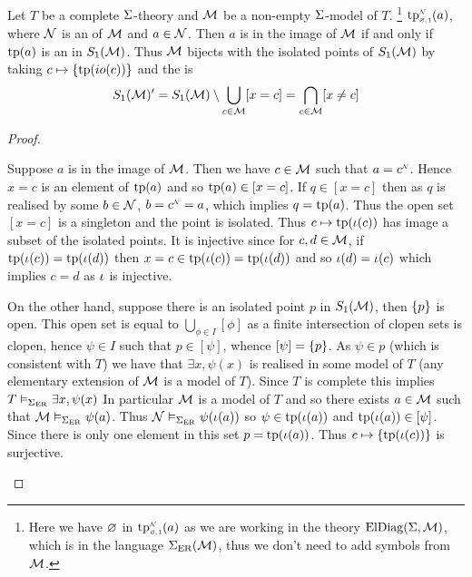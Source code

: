 \begin{lem}
    Let $T$ be a complete $\Sigma$-theory
    and $\mathcal{M}$ be a non-empty $\Sigma$-model of $T$. 
    \footnote{Here we have $\varnothing$ in 
            $\subintp{\nothing,1}{\NN}{\tp}(a)$ as we are working in the theory 
            $\mathrm{ElDiag}(\Sigma,\mathcal{M})$, 
            which is in the language $\Sigma_{\mathrm{ER}}(\mathcal{M})$,
            thus we don't need to add symbols from $\mathcal{M}$.}
        $\subintp{\nothing,1}{\NN}{\tp}(a)$, 
    where $\mathcal{N}$ is an
        of $\mathcal{M}$ and $a \in \mathcal{N}$.
    Then $a$ is in the image of $\mathcal{M}$ if and only if 
    $\operatorname{tp}(a)$ is an  
    in $S_1(\mathcal{M})$.
    Thus $\mathcal{M}$ bijects with the isolated points of $S_1(\mathcal{M})$
    by taking $c \mapsto \left\{\operatorname{tp}(io(c))\right\}$ and the 
     is
    \[  
        S_1(\mathcal{M})' = S_1(\mathcal{M}) \setminus \bigcup_{c \in \mathcal{M}} [x = c]
        = \bigcap_{c \in \mathcal{M}} [x \ne c] 
    \]
\end{lem}
\begin{proof}
    \begin{forward}
        Suppose $a$ is in the image of $\mathcal{M}$.
        Then we have $c \in \mathcal{M}$ such that $a = \nnintp{c}$.
        Hence $x = c$ is an element of $\operatorname{tp}(a)$ and so $\operatorname{tp}(a) \in [x = c]$.
        If $q \in [x = c]$ then as $q$ is realised by some $b \in \mathcal{N}$, 
        $b = \nnintp{c} = a$, 
        which implies $q = \operatorname{tp}(a)$.
        Thus the open set $[x = c]$ is a singleton and the point is isolated.
        Thus $c \mapsto \operatorname{tp}(\iota(c))$ has image a subset of the isolated points.
        It is injective since for $c, d \in \mathcal{M}$, 
        if $\operatorname{tp}(\iota(c)) = \operatorname{tp}(\iota(d))$ then 
        $x = c \in \operatorname{tp}(\iota(c)) = \operatorname{tp}(\iota(d))$
        and so $\iota(d) = \iota(c)$ which implies $c = d$ as $\iota$ is injective.
    \end{forward}
    \begin{backward}
        On the other hand, suppose there is an isolated point $p$ in $S_1(\mathcal{M})$,
        then $\left\{p\right\}$ is open. 
        This open set is equal to $\bigcup_{\phi \in I} [\phi]$
        as a finite intersection of clopen sets is clopen,
        hence $\psi \in I$ such that $p \in [\psi]$, 
        whence $[\psi] = \left\{p\right\}$.
        As $\psi \in p$ (which is consistent with $T$) we have that 
        $\exists x, \psi(x)$ is realised in some model of $T$ 
        (any elementary extension of $\mathcal{M}$ is a model of $T$). 
        Since $T$ is complete
        this implies $T \vDash_{\Sigma_{\mathrm{ER}}} \exists x, \psi(x)$
        In particular $\mathcal{M}$ is a model of $T$ and so there exists 
        $a \in \mathcal{M}$ such that $\mathcal{M} \vDash_{\Sigma_{\mathrm{ER}}} \psi(a)$.
        Thus $\mathcal{N} \vDash_{\Sigma_{\mathrm{ER}}} \psi(\iota(a))$ so $\psi \in \operatorname{tp}(\iota(a))$
        and $\operatorname{tp}(\iota(a)) \in [\psi]$.
        Since there is only one element in this set $p = \operatorname{tp}(\iota(a))$.
        Thus $c \mapsto \left\{\operatorname{tp}(\iota(c))\right\}$ is surjective.
    \end{backward}
\end{proof}

